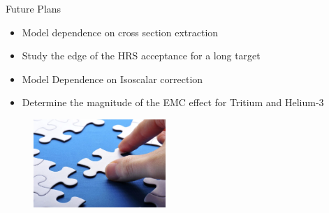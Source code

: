 \documentclass[12pt]{beamer}
\begin{document}
\begin{frame}{}
\begin{block}{Future Plans}
	\begin{itemize}
		\item Model dependence on cross section extraction
		\item Study the edge of the HRS acceptance for a long target 
		\item Model Dependence on Isoscalar correction
		\item Determine the magnitude of the EMC effect for Tritium and Helium-3
	\end{itemize}
\end{block}

\begin{figure}
	\includegraphics[width =5cm]{../images/puzzle2.png}
\end{figure}

\end{frame}


\end{document}
